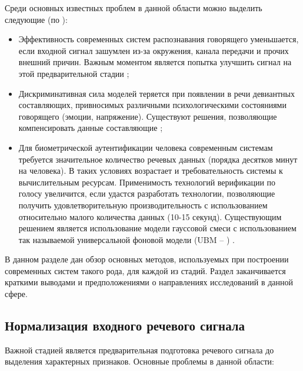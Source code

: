 Среди основных известных проблем в данной области можно выделить следующие (по \cite{Jayanna09overview}):
\begin{itemize}
\item Эффективность современных систем распознавания говорящего уменьшается, если входной сигнал зашумлен из-за окружения, канала передачи и прочих внешний причин. Важным моментом является попытка улучшить сигнал на этой предварительной стадии \cite{Greenwood00suv};
\item Дискриминативная сила моделей теряется при появлении в речи девиантных составляющих, привносимых различными психологическими состояниями говорящего (эмоции, напряжение). Существуют решения, позволяющие компенсировать данные составляющие \cite{Alamo96discriminative};
\item Для биометрической аутентификации человека современным системам требуется значительное количество речевых данных (порядка десятков минут на человека). В таких условиях возрастает и требовательность системы к вычислительным ресурсам. Применимость технологий верификации по голосу увеличится, если удастся разработать технологии, позволяющие получить удовлетворительную производительность с использованием относительно малого количества данных (10-15 секунд). Существующим решением является использование модели гауссовой смеси с использованием так называемой универсальной фоновой модели (UBM -- ) \cite{Reynolds00speakerverification}.
\end{itemize}

В данном разделе дан обзор основных методов, используемых при построении современных систем такого рода, для каждой из стадий. Раздел заканчивается краткими выводами и предположениями о направлениях исследований в данной сфере.

\subsection{Нормализация входного речевого сигнала}

Важной стадией является предварительная подготовка речевого сигнала до выделения характерных признаков. Основные проблемы в данной области:


